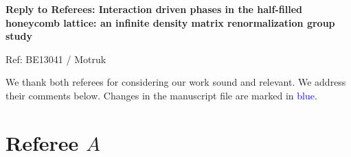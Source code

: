 \documentclass[aps,prb,superscriptaddress]{revtex4}
\newcommand{\blue}[1]{{\textcolor{blue}{#1}}}
\begin{document}
\begin{center}
{\bf Reply to Referees: Interaction driven phases in the half-filled honeycomb lattice: an infinite density matrix renormalization group study}

\end{center}
\begin{flushright}
Ref: BE13041 / Motruk
\end{flushright}

\vspace{0.2cm}


We thank both referees for considering our work sound and relevant.
We address their comments below. Changes in the manuscript file are marked in \blue{blue}.
\\

\section*{Referee $ A$}
\end{document}
